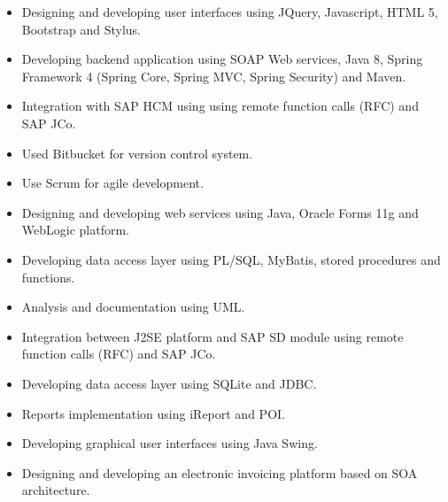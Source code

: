 \documentclass[10pt,a4paper,ragged2e]{altacv}
\begin{document}
\vspace{10px}

\begin{itemize}
   \item Designing and developing user interfaces using JQuery, Javascript, HTML 5, Bootstrap and Stylus.
   \item Developing backend application using SOAP Web services, Java 8, Spring Framework 4 (Spring Core, Spring MVC, Spring Security) and Maven.
   \item Integration with SAP HCM using using remote function calls (RFC) and SAP JCo.
   \item Used Bitbucket for version control system.
   \item Use Scrum for agile development.
\end{itemize}

\vspace{10px}

\begin{itemize}
   \item Designing and developing web services using Java, Oracle Forms 11g and WebLogic platform.
   \item Developing data access layer using  PL/SQL, MyBatis, stored procedures and functions.
   \item Analysis and documentation using UML.
\end{itemize}

\vspace{10px}

\begin{itemize}
   \item Integration between J2SE platform and SAP SD module using remote function calls (RFC) and SAP JCo.
   \item Developing data access layer using SQLite and JDBC.
   \item Reports implementation using iReport and POI.
   \item Developing graphical user interfaces using Java Swing.
   \item Designing and developing an electronic invoicing platform based on SOA architecture.
\end{itemize}
\end{document}
